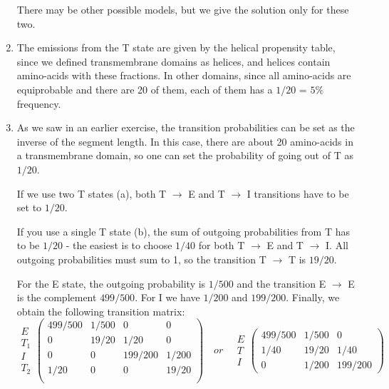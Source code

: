 \documentclass[a4paper,11pt]{article}
\begin{document}
\begin{enumerate}
There may be other possible models, but we give the solution only for these two.

\item The emissions from the T state are given by the helical propensity table, since we defined transmembrane domains as 
helices, and helices contain amino-acids with these fractions. In other domains, since all amino-acids are equiprobable and there
are 20 of them, each of them has a $1/20$ = $5\%$ frequency.

\item As we saw in an earlier exercise, the transition probabilities can be set as the inverse of the segment length.
In this case, there are about 20 amino-acids in a transmembrane domain, so one can set the probability of
going out of T as $1/20$. 

If we use two T states (a), both T $\rightarrow$ E and T $\rightarrow$ I transitions have to 
be set to $1/20$.

If you use a single T state (b), the sum of outgoing probabilities from T has to be $1/20$ - the easiest
is to choose $1/40$ for both T $\rightarrow$ E and T $\rightarrow$ I. 
All outgoing probabilities must sum to 1, so the transition T $\rightarrow$ T is $19/20$. 

For the E state, the outgoing probability is $1/500$ and the transition E $\rightarrow$ E is the complement 
$499/500$. For I we have $1/200$ and $199/200$. Finally, we obtain the following transition matrix:
$$
\begin{array}{c}
E \\ T_1 \\ I \\ T_2
\end{array}
\left( 
\begin{array}{cccc}
499/500 & 1/500 & 0            & 0 \\
0            & 19/20 & 1/20       & 0 \\
0            & 0        & 199/200 & 1/200 \\
1/20       & 0        & 0            & 19/20 \\
\end{array}
\right)
\quad or \quad 
\begin{array}{c}
E \\ T \\ I
\end{array}
\left( 
\begin{array}{ccc}
499/500 & 1/500 & 0 \\
1/40       & 19/20 & 1/40 \\
0            & 1/200 & 199/200 
\end{array}
\right)
$$


\end{enumerate}
\end{document}
